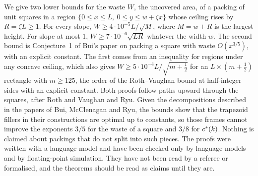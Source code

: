 We give two lower bounds for the waste $W$, the uncovered area, of a packing of unit squares in a region $\{0\le x\le L,\ 0\le y\le w+\zeta x\}$ whose ceiling rises by $R=\zeta L\ge1$. For every slope, $W\ge4\cdot10^{-5}L/\sqrt M$, where $M=w+R$ is the largest height. For slope at most $1$, $W\ge7\cdot10^{-6}\sqrt{LR}$ whatever the width $w$. The second bound is Conjecture~1 of Bui's paper on packing a square with waste $O(x^{3/5})$, with an explicit constant. The first comes from an inequality for regions under any concave ceiling, which also gives $W\ge5\cdot10^{-4}L/\sqrt{m+\frac12}$ for an $L\times(m+\frac12)$ rectangle with $m\ge125$, the order of the Roth--Vaughan bound at half-integer sides with an explicit constant. Both proofs follow paths upward through the squares, after Roth and Vaughan and Ryu. Given the decompositions described in the papers of Bui, McClenagan and Ryu, the bounds show that the trapezoid fillers in their constructions are optimal up to constants, so those frames cannot improve the exponents $3/5$ for the waste of a square and $3/8$ for $c^{*}(k)$. Nothing is claimed about packings that do not split into such pieces. The proofs were written with a language model and have been checked only by language models and by floating-point simulation. They have not been read by a referee or formalised, and the theorems should be read as claims until they are.

